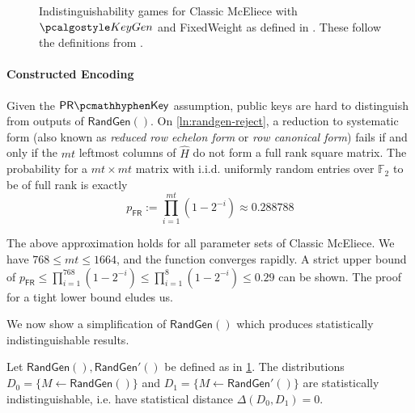 \begin{figure}
    
    \caption{Indistinguishability games for Classic McEliece with $\kgen$ and \textsf{FixedWeight} as defined in \cite{NISTPQC-R4:ClassicMcEliece22}. These follow the definitions from \cite[Definition~K.1]{EC:Xagawa22}.}
    \label{fig:classic-mceliece-assumptions}
\end{figure}

\paragraph{Constructed Encoding}

Given the $\prkey$ assumption, public keys are hard to distinguish from outputs of $\textsf{RandGen}()$. On \cref{ln:randgen-reject}, a reduction to systematic form (also known as \emph{reduced row echelon form} or \emph{row canonical form}) fails if and only if the $mt$ leftmost columns of $\hat H$ do not form a full rank square matrix.
The probability for a $mt \times mt$ matrix with i.i.d. uniformly random entries over $\mathbb F_2$ to be of full rank is exactly \cite{DBLP:journals/corr/SalmondGGC14}
\[ p_\textsf{FR} := \prod_{i=1}^{mt} \left( 1-2^{-i} \right) \approx 0.288788 \]

The above approximation holds for all parameter sets of Classic McEliece. We have $768 \leq mt \leq 1664$, and the function converges rapidly. A strict upper bound of $p_\textsf{FR} \leq \prod_{i=1}^{768} \left( 1-2^{-i} \right) \leq \prod_{i=1}^{8} \left( 1-2^{-i} \right) \leq 0.29$ can be shown. The proof for a tight lower bound eludes us.

We now show a simplification of $\textsf{RandGen}()$ which produces statistically indistinguishable results.

\begin{lemma} \label{lem:classic-mceliece-randgen-prime}
    Let $\textsf{RandGen}(), \textsf{RandGen}'()$ be defined as in \cref{fig:classic-mceliece-assumptions}.
    The distributions $D_0 = \{ M \gets \textsf{RandGen}() \}$ and $D_1 = \{ M \gets \textsf{RandGen}'() \}$ are statistically indistinguishable, i.e. have statistical distance $\Delta(D_0, D_1) = 0$.
\end{lemma}


